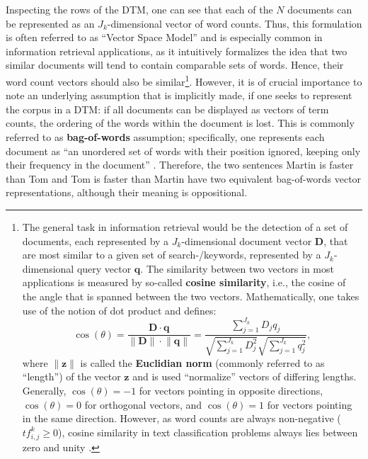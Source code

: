 Inspecting the rows of the DTM, one can see that each of the $N$ documents can be represented as an $J_k$-dimensional vector of word counts. Thus, this formulation is often referred to as \enquote{Vector Space Model} and is especially common in information retrieval applications, as it intuitively formalizes the idea that two similar documents will tend to contain comparable sets of words. Hence, their word count vectors should also be similar\footnote{The general task in information retrieval would be the detection of a set of documents, each represented by a $J_k$-dimensional document vector $\mathbf{D}$, that are most similar to a given set of search-/keywords, represented by a $J_k$-dimensional query vector $\mathbf{q}$. The similarity between two vectors in most applications is measured by so-called \textbf{cosine similarity}, i.e., the cosine of the angle that is spanned between the two vectors. Mathematically, one takes use of the notion of dot product and defines: 
\begin{equation*}
\cos(\theta) = \dfrac{\mathbf{D} \cdot \mathbf{q}}{\lVert \mathbf{D} \rVert \cdot \lVert \mathbf{q} \rVert} = \dfrac{\sum_{j=1}^{J_k} D_j q_j}{\sqrt{\sum_{j=1}^{J_k} D_j^2} \sqrt{\sum_{j=1}^{J_k} q_j^2}},
\end{equation*}
where $\lVert \mathbf{z} \rVert$ is called the \textbf{Euclidian norm} (commonly referred to as \enquote{length}) of the vector $\mathbf{z}$ and is used \enquote{normalize} vectors of differing lengths. Generally, $\cos(\theta) = -1$ for vectors pointing in opposite directions, $\cos(\theta) = 0$ for orthogonal vectors, and $\cos(\theta) = 1$ for vectors pointing in the same direction. However, as word counts are always non-negative ($tf_{i,j}^{k} \geq 0$), cosine similarity in text classification problems always lies between zero and unity \parencite[280]{Jurafsky_Draft_2017}.}. However, it is of crucial importance to note an underlying assumption that is implicitly made, if one seeks to represent the corpus in a DTM: if all documents can be displayed as vectors of term counts, the ordering of the words within the document is lost. This is commonly referred to as \textbf{bag-of-words} assumption; specifically, one represents each document as \enquote{an unordered set of words with their position ignored, keeping only their frequency in the document} \parencite[76]{Jurafsky_Draft_2017}. Therefore, the two sentences \textsf{Martin is faster than Tom} and \textsf{Tom is faster than Martin} have two equivalent bag-of-words vector representations, although their meaning is oppositional. 

